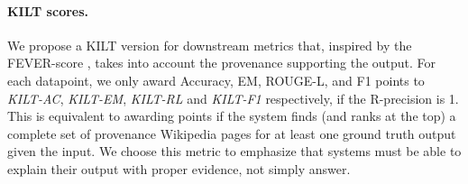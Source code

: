 \documentclass[11pt]{article}
\begin{document}
 
\paragraph{KILT scores.}
We propose a KILT version for downstream metrics that, inspired by the FEVER-score \cite{Thorne18Fever}, takes into account the provenance supporting the output.
For each datapoint, we only award Accuracy, EM, ROUGE-L, and F1 points to \textit{KILT-AC}, \textit{KILT-EM}, \textit{KILT-RL} and \textit{KILT-F1} respectively, if the R-precision is 1. This is equivalent to awarding points if the system finds (and ranks at the top) a complete set of provenance Wikipedia pages for at least one ground truth output given the input. We choose this metric to emphasize that systems must be able to explain their output with proper evidence, not simply answer.
\end{document}
